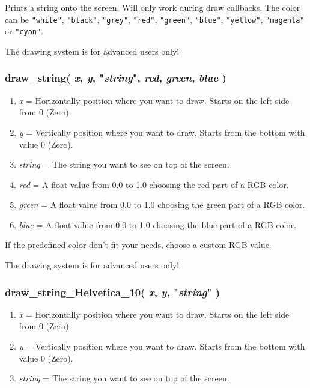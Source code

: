 \documentclass[11pt,parskip=half,a4paper]{scrartcl}
\begin{document}
Prints a string onto the screen. Will only work during draw callbacks. The color can be \verb|"white"|, \verb|"black"|, \verb|"grey"|, \verb|"red"|, \verb|"green"|, \verb|"blue"|, \verb|"yellow"|, \verb|"magenta"| or \verb|"cyan"|.

The drawing system is for advanced users only!

\subsubsection{draw\_string( \emph{x}, \emph{y}, "\emph{string}",  \emph{red}, \emph{green}, \emph{blue} )}

\begin{enumerate}
	\item \emph{x} = Horizontally position where you want to draw. Starts on the left side from 0 (Zero).
	\item \emph{y} = Vertically position where you want to draw. Starts from the bottom with value 0 (Zero).
	\item \emph{string} = The string you want to see on top of the screen.
	\item \emph{red} = A float value from 0.0 to 1.0 choosing the red part of a RGB color.
	\item \emph{green} = A float value from 0.0 to 1.0 choosing the green part of a RGB color.
	\item \emph{blue} = A float value from 0.0 to 1.0 choosing the blue part of a RGB color.
\end{enumerate}

If the predefined color don't fit your needs, choose a custom RGB value.

The drawing system is for advanced users only!

\subsubsection{draw\_string\_Helvetica\_10( \emph{x}, \emph{y}, "\emph{string}" )}

\begin{enumerate}
	\item \emph{x} = Horizontally position where you want to draw. Starts on the left side from 0 (Zero).
	\item \emph{y} = Vertically position where you want to draw. Starts from the bottom with value 0 (Zero).
	\item \emph{string} = The string you want to see on top of the screen.
\end{enumerate}
\end{document}
